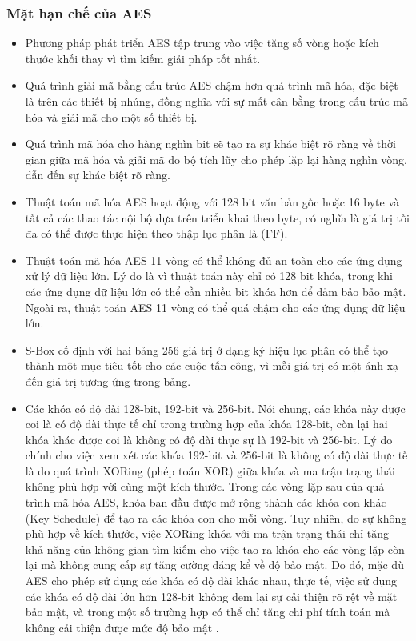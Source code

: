 \subsubsection{Mặt hạn chế của AES }
\begin{itemize}
    \item Phương pháp phát triển AES tập trung vào việc tăng số vòng hoặc kích thước khối thay vì tìm kiếm giải pháp tốt nhất.
    \item Quá trình giải mã bằng cấu trúc AES chậm hơn quá trình mã hóa, đặc biệt là trên các thiết bị nhúng, đồng nghĩa với sự mất cân bằng trong cấu trúc mã hóa và giải mã cho một số thiết bị.
    \item Quá trình mã hóa cho hàng nghìn bit sẽ tạo ra sự khác biệt rõ ràng về thời gian giữa mã hóa và giải mã do bộ tích lũy cho phép lặp lại hàng nghìn vòng, dẫn đến sự khác biệt rõ ràng.
    \item Thuật toán mã hóa AES hoạt động với 128 bit văn bản gốc hoặc 16 byte và tất cả các thao tác nội bộ dựa trên triển khai theo byte, có nghĩa là giá trị tối đa có thể được thực hiện theo thập lục phân là (FF).
    \item Thuật toán mã hóa AES 11 vòng có thể không đủ an toàn cho các ứng dụng xử lý dữ liệu lớn. Lý do là vì thuật toán này chỉ có 128 bit khóa, trong khi các ứng dụng dữ liệu lớn có thể cần nhiều bit khóa hơn để đảm bảo bảo mật. Ngoài ra, thuật toán AES 11 vòng có thể quá chậm cho các ứng dụng dữ liệu lớn.
    \item S-Box cố định với hai bảng 256 giá trị ở dạng ký hiệu lục phân có thể tạo thành một mục tiêu tốt cho các cuộc tấn công, vì mỗi giá trị có một ánh xạ đến giá trị tương ứng trong bảng.
    \item Các khóa có độ dài 128-bit, 192-bit và 256-bit. Nói chung, các khóa này được coi là có độ dài thực tế chỉ trong trường hợp của khóa 128-bit, còn lại hai khóa khác được coi là không có độ dài thực sự là 192-bit và 256-bit.
     Lý do chính cho việc xem xét các khóa 192-bit và 256-bit là không có độ dài thực tế là do quá trình XORing (phép toán XOR) giữa khóa và ma trận trạng thái không phù hợp với cùng một kích thước. Trong các vòng lặp sau của quá trình mã hóa AES, khóa ban đầu được mở rộng thành các khóa con khác (Key Schedule) để tạo ra các khóa con cho mỗi vòng. Tuy nhiên, do sự không phù hợp về kích thước, việc XORing khóa với ma trận trạng thái chỉ tăng khả năng của không gian tìm kiếm cho việc tạo ra khóa cho các vòng lặp còn lại mà không cung cấp sự tăng cường đáng kể về độ bảo mật.
    Do đó, mặc dù AES cho phép sử dụng các khóa có độ dài khác nhau, thực tế, việc sử dụng các khóa có độ dài lớn hơn 128-bit không đem lại sự cải thiện rõ rệt về mặt bảo mật, và trong một số trường hợp có thể chỉ tăng chi phí tính toán mà không cải thiện được mức độ bảo mật \cite{dawood2017analytical}.
\end{itemize}



